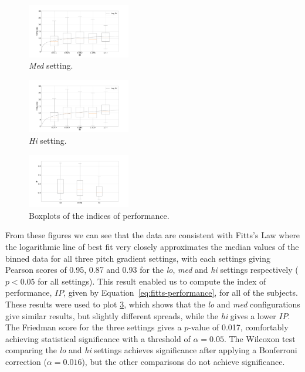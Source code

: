 \documentclass[sigconf, screen=true, anonymous=true]{acmart}
\begin{document}
\begin{figure}
  \centering
  \includegraphics[clip, trim=120 20 120 20, width=0.4\textwidth]{figures/fitts_med.png}
  \caption{\emph{Med} setting. }
  \label{fig:fitts-med}
\end{figure}

\begin{figure}
  \centering
  \includegraphics[clip, trim=120 20 120 20, width=0.4\textwidth]{figures/fitts_hi.png}
  \caption{\emph{Hi} setting. }
  \label{fig:fitts-hi}
\end{figure}

\begin{figure}
  \centering
  \includegraphics[clip, trim=90 20 130 20, width=0.4\textwidth]{figures/fitts_performance.png}
  \caption{Boxplots of the indices of performance.}
  \label{fig:fitts-performance}
\end{figure}

From these figures we can see that the data are consistent with Fitts's Law where the logarithmic line of best fit very closely approximates the median values of the binned data for all three pitch gradient settings, with each settings giving Pearson scores of 0.95, 0.87 and 0.93 for the \emph{lo}, \emph{med} and \emph{hi} settings respectively ($p < 0.05$ for all settings). 
This result enabled us to compute the index of performance, $IP$, given by Equation~\ref{eq:fitts-performance}, for all of the subjects.
These results were used to plot \cref{fig:fitts-performance}, which shows that the \emph{lo} and \emph{med} configurations give similar results, but slightly different spreads, while the \emph{hi} gives a lower $IP$.
The Friedman score for the three settings gives a $p$-value of 0.017, comfortably achieving statistical significance with a threshold of $\alpha=0.05$.
The Wilcoxon test comparing the \emph{lo} and \emph{hi} settings achieves significance after applying a Bonferroni correction ($\alpha=0.016$), but the other comparisons do not achieve significance. 
\end{document}
